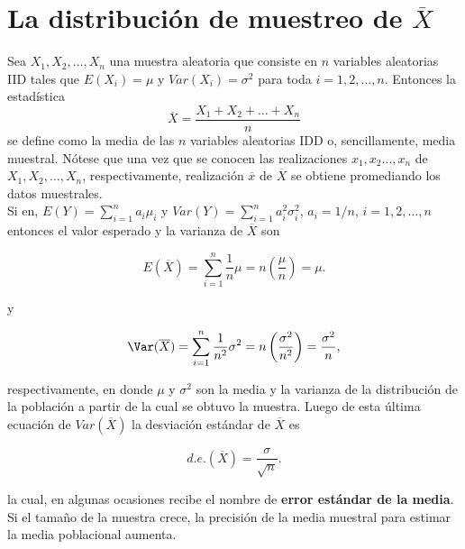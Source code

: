 \section{\boldmath La distribución de muestreo de $\overline{X}$}

Sea $X_1,X_2,\ldots , X_n$ una muestra aleatoria que consiste en $n$ variables aleatorias IID tales que $E(X_i)=\mu$ y $Var(X_i)=\sigma^2$ para toda $i=1,2,\ldots,n$. Entonces la estadística
$$\overline{X}=\dfrac{X_1+X_2+\ldots + X_n}{n}$$
se define como la media de las $n$ variables aleatorias IDD o, sencillamente, media muestral. Nótese que una vez que se conocen las realizaciones $x_1,x_2\ldots,x_n$ de $X_1,X_2,\ldots,X_n$, respectivamente, realización $\overline{x}$ de $\overline{X}$ se obtiene promediando los datos muestrales. \\
Si en, $E(Y)=\sum_{i=1}^{n}a_i\mu_i$ y $Var(Y)=\sum_{i=1}^n a_i^2 \sigma_i^2$, $a_i=1/n$, $i=1,2,\ldots,n$ entonces el valor esperado y la varianza de $\overline{X}$ son
\begin{tcolorbox}
$$E(\overline{X})=\sum_{i=1}^n \dfrac{1}{n}\mu=n\left(\dfrac{\mu}{n}\right)=\mu.$$
\end{tcolorbox}
y
\begin{tcolorbox}
$$\Var(\overline{X}) = \sum_{i=1}^n \dfrac{1}{n^2} \sigma^2 = n \left(\dfrac{\sigma^2}{n^2}\right)=\dfrac{\sigma^2}{n},$$
\end{tcolorbox}
respectivamente, en donde $\mu$ y $\sigma^2$ son la media y la varianza de la distribución de la población a partir de la cual se obtuvo la muestra. Luego de esta última ecuación de $Var(\overline{X})$ la desviación estándar de $\overline{X}$ es
\begin{tcolorbox}
    $$d.e.(\overline{X})=\dfrac{\sigma}{\sqrt{n}}.$$
\end{tcolorbox}
la cual, en algunas ocasiones recibe el nombre de \textbf{error estándar de la media}. Si el tamaño de la muestra crece, la precisión de la media muestral para estimar la media poblacional aumenta. 

